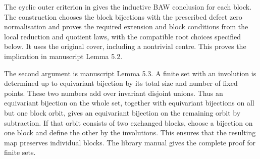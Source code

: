 The cyclic outer criterion in \cite[Corollary~2.13]{FengLiZhang2019} gives
the inductive BAW conclusion for each block. The construction chooses the
block bijections with the prescribed defect zero normalisation and
proves the required extension and block conditions from the local
reduction and quotient laws, with the compatible root choices specified
below. It uses the original cover, including a
nontrivial centre. This proves the implication in manuscript Lemma 5.2.

The second argument is manuscript Lemma 5.3. A finite set with an involution
is determined up to equivariant bijection by its total size and number of
fixed points. These two numbers add over invariant disjoint unions. Thus an
equivariant bijection on the whole set, together with equivariant bijections
on all but one block orbit, gives an equivariant bijection on the remaining
orbit by subtraction. If that orbit consists of two exchanged blocks, choose
a bijection on one block and define the other by the involutions. This
ensures that the resulting map preserves individual blocks. The library
manual gives the complete proof for finite sets.

